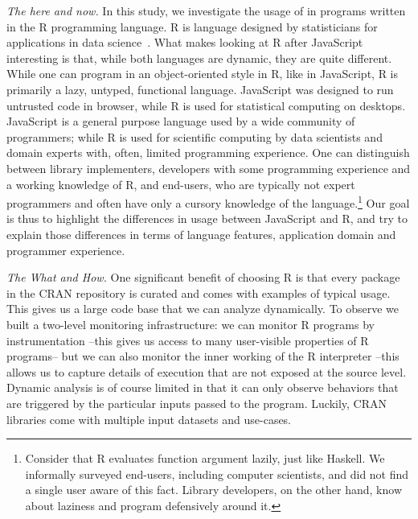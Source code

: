 \documentclass[USenglish,cleveref, autoref, thm-restate]{lipics-v2019}
\begin{document}
\vspace{2mm}\noindent\emph{The here and now.}  In this study, we
investigate the usage of \eval in programs written in the R
programming language. R is language designed by statisticians for
applications in data science~\cite{r}. What makes looking at R after
JavaScript interesting is that, while both languages are dynamic, they
are quite different. While one can program in an object-oriented style
in R, like in JavaScript, R is primarily a lazy, untyped, functional
language.  JavaScript was designed to run untrusted code in browser,
while R is used for statistical computing on desktops. JavaScript is a
general purpose language used by a wide community of programmers;
while R is used for scientific computing by data scientists and domain
experts with, often, limited programming experience. One can
distinguish between library implementers, developers with some
programming experience and a working knowledge of R, and end-users,
who are typically not expert programmers and often have only a cursory
knowledge of the language.\footnote{Consider that R evaluates function
argument lazily, just like Haskell. We informally surveyed end-users,
including computer scientists, and did not find a single user aware of
this fact. Library developers, on the other hand, know about laziness
and program defensively around it.} Our goal is thus to highlight the
differences in usage between JavaScript and R, and try to explain
those differences in terms of language features, application domain
and programmer experience.

\vspace{2mm}\noindent\emph{The What and How.}  One significant benefit
of choosing R is that every package in the CRAN repository is curated
and comes with examples of typical usage. This gives us a large code
base that we can analyze dynamically.  To observe \eval we built a
two-level monitoring infrastructure: we can monitor R programs by
instrumentation --this gives us access to many user-visible properties
of R programs-- but we can also monitor the inner working of the R
interpreter --this allows us to capture details of execution that are
not exposed at the source level. Dynamic analysis is of course limited
in that it can only observe behaviors that are triggered by the
particular inputs passed to the program. Luckily, CRAN libraries come
with multiple input datasets and use-cases.
\end{document}
